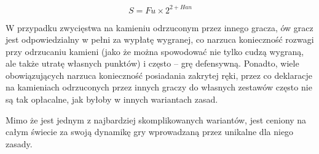 	\begin{equation*}
		S = Fu \times 2^{2 + Han}
		\label{rīchi_scoring}
	\end{equation*}
	
W przypadku zwycięstwa na kamieniu odrzuconym przez innego gracza, ów gracz jest
odpowiedzialny w pełni za wypłatę wygranej, co narzuca konieczność rozwagi przy
odrzucaniu kamieni (jako że można spowodować nie tylko cudzą wygraną, ale także
utratę własnych punktów) i często -- grę defensywną. Ponadto, wiele
obowiązujących  narzuca konieczność posiadania zakrytej ręki, przez
co deklaracje na kamieniach odrzuconych przez innych graczy do własnych zestawów
często nie są tak opłacalne, jak byłoby w innych wariantach zasad.

Mimo że  jest jednym z najbardziej skomplikowanych wariantów, jest
ceniony na całym świecie za swoją dynamikę gry wprowadzaną przez unikalne dla
niego zasady. 


